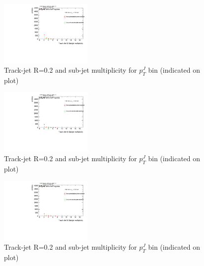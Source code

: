 \begin{figure}
 
\includegraphics[width=0.4\textwidth]{appendixB/mTAS_W_calibmCal_20:07:01-03-11-2016/13cfrt_h_SubJet_aftersel_ptJ08TAmult.pdf}
\caption{Track-jet R=0.2 and sub-jet multiplicity for $p_{T}^{J}$ bin (indicated on plot) }
 
\end{figure}

\begin{figure}

\includegraphics[width=0.4\textwidth]{appendixB/mTAS_W_calibmCal_20:07:01-03-11-2016/13cfrt_h_SubJet_aftersel_ptJ09TAmult.pdf}
\caption{Track-jet R=0.2 and sub-jet multiplicity for $p_{T}^{J}$ bin (indicated on plot) }
 
\end{figure}
 
\begin{figure}

\includegraphics[width=0.4\textwidth]{appendixB/mTAS_W_calibmCal_20:07:01-03-11-2016/13cfrt_h_SubJet_aftersel_ptJ10TAmult.pdf}
\caption{Track-jet R=0.2 and sub-jet multiplicity for $p_{T}^{J}$ bin (indicated on plot) }

\end{figure}

